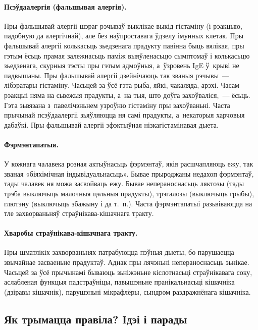 \paragraph{Псэўдаалергія (фальшывая алергія).}
Пры фальшывай алергіі шэраг рэчываў выклікае выкід гістаміну (і рэакцыю, падобную да алергічнай), але без наўпроставага ўдзелу імунных клетак. Пры фальшывай алергіі колькасьць зьедзенага прадукту павінна быць вялікая, пры гэтым ёсьць прамая залежнасьць паміж выяўленасьцю сымптомаў і колькасьцю зьедзенага, скурныя тэсты пры гэтым адмоўныя, а~ўзровень IgE ў~крыві не падвышаны. Пры фальшывай алергіі дзейнічаюць так званыя рэчывы~--- лібэратары гістаміну. Часьцей за ўсё гэта рыба, яйкі, чакаляда, арэхі. Часам рэакцыі няма на сьвежыя прадукты, а~на тыя, што доўга захоўваліся,~--- ёсьць. Гэта зьвязана з~павелічэньнем узроўню гістаміну пры захоўваньні. Часта прычынай псэўдаалергіі зьяўляюцца ня самі прадукты, а~некаторыя харчовыя дабаўкі. Пры фальшывай алергіі эфэктыўная нізкагістамінавая дыета.

\paragraph{Фэрмэнтапатыя.}
У кожнага чалавека розная актыўнасьць фэрмэнтаў, якія расшчапляюць ежу, так званая «біяхімічная індывідуальнасьць». Бывае прыроджаны недахоп фэрмэнтаў, тады чалавек ня можа засвойваць ежу. Бывае непераноснасьць ляктозы (тады трэба выключыць малочныя цэльныя прадукты), трэгалозы (выключыць грыбы), глютэну (выключыць збажыну і да т.~п.). Часта фэрмэнтапатыі разьвіваюцца на тле захворваньняў страўнікава-кішачнага тракту.


\paragraph{Хваробы страўнікава-кішачнага тракту.}
Пры шматлікіх захворваньнях патрабуюцца пэўныя дыеты, бо парушаецца звычайнае засваеньне прадуктаў. Аднак пры лячэньні непераноснасьць зьнікае. Часьцей за ўсё прычынамі бываюць зьніжэньне кіслотнасьці страўнікавага соку, аслабленая функцыя падстраўніцы, павышэньне пранікальнасьці кішачніка (дзіравы кішачнік), парушэньні мікрафлёры, сындром раздражнёнага кішачніка.

\subsection{Як трымацца правіла? Ідэі і парады}


